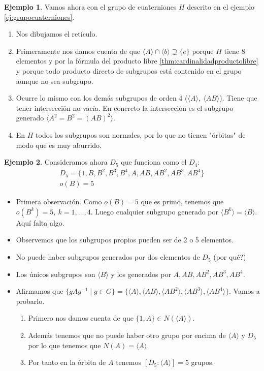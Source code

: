 \documentclass{book}
\theoremstyle{definition}
\newtheorem{ej}{Ejemplo}
\theoremstyle{remark}
\newcommand{\inv}[1]{#1^{-1}}
\begin{document}
\begin{ej}
	Vamos ahora con el grupo de cuaterniones $H$ descrito en el ejemplo \ref{ej:grupocuaterniones}.
	
	\begin{enumerate}
		\item Nos dibujamos el retículo.
		\item Primeramente nos damos cuenta de que $\langle A \rangle \cap \langle b \rangle \supsetneq \{e\}$ porque $H$ tiene 8 elementos y por la fórmula del producto libre \ref{thm:cardinalidadproductolibre} y porque todo producto directo de subgrupos está contenido en el grupo aunque no sea subgrupo.
		\item Ocurre lo mismo con los demás subgrupos de orden 4 ($\langle A \rangle,\ \langle AB \rangle$). Tiene que tener intersección no vacía. En concreto la intersección es el subgrupo generado $\langle A^2 = B^2 = (AB)^2 \rangle$.
		\item En $H$ todos los subgrupos son normales, por lo que no tienen "órbitas" de modo que es muy aburrido.
	\end{enumerate}
\end{ej}

\begin{ej}
	Consideramos ahora $D_5$ que funciona como el $D_4$:
	\begin{align*}
		D_5 = \{1, B, B^2, B^3, B^4, A, AB, AB^2, AB^3, AB^4\} \\
		o(B) = 5
	\end{align*}
	\begin{itemize}
		\item Primera observación. Como $o(B) = 5$ que es primo, tenemos que $o(B^k) = 5,\ k = 1, \dots, 4$. Luego cualquier subgrupo generado por $\langle B^k \rangle = \langle B \rangle$. Aquí falta algo.
		\item Observemos que los subgrupos propios pueden ser de 2 o 5 elementos.
		\item No puede haber subgrupos generados por dos elementos de $D_5$ (por qué?)
		\item Los únicos subgrupos son $\langle B \rangle$ y los generados por $A, AB, AB^2, AB^3, AB^4$.
		\item Afirmamos que $\{gA\inv{g} \mid g \in G\} = \{\langle A \rangle, \langle AB \rangle, \langle AB^2 \rangle, \langle AB^3 \rangle, \langle AB^4 \rangle \}$. Vamos a probarlo.
		
		\begin{enumerate}
			\item Primero nos damos cuenta de que $\{1, A\} \in N(\langle A \rangle)$.
			\item Además tenemos que no puede haber otro grupo por encima de $\langle A \rangle$ y $D_5$ por lo que tenemos que $N(A) = \langle A \rangle$.
			\item Por tanto en la órbita de $A$ tenemos $[D_5:\langle A \rangle] = 5$ grupos.
		\end{enumerate}
		
	\end{itemize}
\end{ej}
\end{document}
